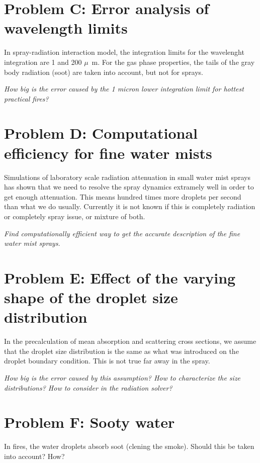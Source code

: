 \documentclass[12pt]{article}
\begin{document}
\section{Problem C: Error analysis of wavelength limits}

In spray-radiation interaction model, the integration limits for the wavelenght integration are 1 and 200 $\mu$~m. For the gas phase properties,
the tails of the gray body radiation (soot) are taken into account, but not for sprays. \newline

{\em How big is the error caused by the 1 micron lower integration limit for hottest practical fires?}

\section{Problem D: Computational efficiency for fine water mists}

Simulations of laboratory scale radiation attenuation in small water mist sprays has shown that we need to resolve the spray dynamics extramely 
well in order to get enough attenuation. This means hundred times more droplets per second than what we do usually. 
Currently it is not known if this is completely radiation or completely spray issue, or mixture of both. 
\newline

{\em Find computationally efficient way to get the accurate description of the fine water mist sprays.}

\section{Problem E: Effect of the varying shape of the droplet size distribution}

In the precalculation of mean absorption and scattering cross sections, we assume that the droplet size distribution is the same as what
was introduced on the droplet boundary condition. This is not true far away in the spray. 
\newline

{\em How big is the error caused by this assumption? How to characterize the size distributions? How to consider in the radiation solver?}

\section{Problem F: Sooty water}

In fires, the water droplets absorb soot (clening the smoke). Should this be taken into account? How?
\end{document}
